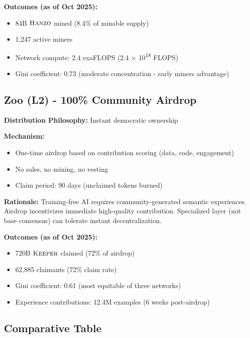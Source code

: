 \documentclass[11pt,letterpaper]{article}
\theoremstyle{definition}
\theoremstyle{remark}
\newcommand{\KEEPER}{\textsc{Keeper}}
\newcommand{\Hanzo}{\textsc{Hanzo}}
\begin{document}
\textbf{Outcomes (as of Oct 2025):}
\begin{itemize}
\item 84B $\Hanzo$ mined (8.4\% of minable supply)
\item 1,247 active miners
\item Network compute: 2.4 exaFLOPS (2.4 × 10\textsuperscript{18} FLOPS)
\item Gini coefficient: 0.73 (moderate concentration - early miners advantage)
\end{itemize}

\subsection{Zoo (L2) - 100\% Community Airdrop}

\textbf{Distribution Philosophy:} Instant democratic ownership

\textbf{Mechanism:}
\begin{itemize}
\item One-time airdrop based on contribution scoring (data, code, engagement)
\item No sales, no mining, no vesting
\item Claim period: 90 days (unclaimed tokens burned)
\end{itemize}

\textbf{Rationale:} Training-free AI requires community-generated semantic experiences. Airdrop incentivizes immediate high-quality contribution. Specialized layer (not base consensus) can tolerate instant decentralization.

\textbf{Outcomes (as of Oct 2025):}
\begin{itemize}
\item 720B $\KEEPER$ claimed (72\% of airdrop)
\item 62,885 claimants (72\% claim rate)
\item Gini coefficient: 0.61 (most equitable of three networks)
\item Experience contributions: 12.4M examples (6 weeks post-airdrop)
\end{itemize}

\subsection{Comparative Table}
\end{document}
